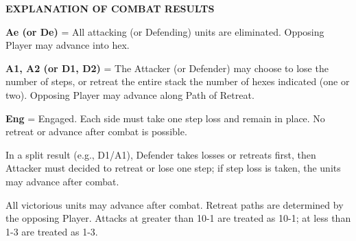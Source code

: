 \begin{strip}
  \bigskip

\end{strip}

\begin{flushleft}
  \textbf{EXPLANATION OF COMBAT RESULTS}
\end{flushleft}

\textbf{Ae (or De)} = All attacking (or Defending) units are eliminated. Opposing Player may advance into hex.
\par
\textbf{A1, A2 (or D1, D2)} = The Attacker (or Defender) may choose to lose the number of steps, or retreat the entire stack the number of hexes indicated (one or two). Opposing Player may advance along Path of Retreat.
\par
\textbf{Eng} = Engaged. Each side must take one step loss and remain in place. No retreat or advance after combat is possible.
\par
In a split result (e.g., D1/A1), Defender takes losses or retreats first, then Attacker must decided to retreat or lose one step; if step loss is taken, the units may advance after combat.
\par
All victorious units may advance after combat. Retreat paths are determined by the opposing Player. Attacks at greater than 10-1 are treated as 10-1; at less than 1-3 are treated as 1-3.